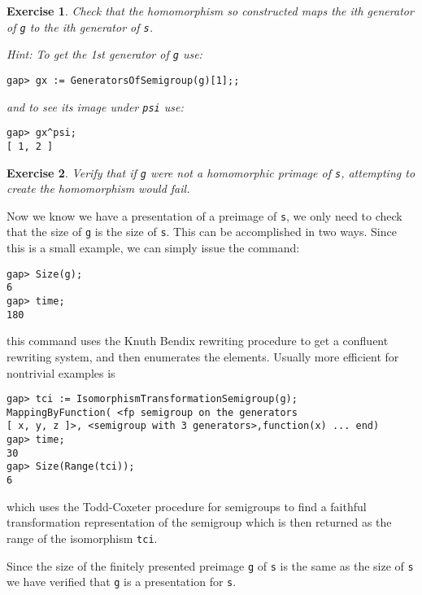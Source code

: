 \documentclass{ws-p8-50x6-00}
\theoremstyle{plain} \newtheorem{Thm}{Theorem}
\theoremstyle{plain} \newtheorem{Cor}{Corollary}
\theoremstyle{plain} \newtheorem{Lemma}{Lemma}
\theoremstyle{plain} \newtheorem{Prop}{Proposition}
\theoremstyle{plain} \newtheorem{Ex}{Exercise}
\begin{document}
\begin{Ex}
Check that the homomorphism so constructed maps the ith generator
of {\tt g} to the ith generator of {\tt s}.
{\rm Hint: To get the 1st generator of {\tt g} use:
\begin{verbatim}
gap> gx := GeneratorsOfSemigroup(g)[1];;
\end{verbatim}
and to see its image under {\tt psi} use:
\begin{verbatim}
gap> gx^psi;                                      
[ 1, 2 ]
\end{verbatim}}
\end{Ex}

\begin{Ex} 
Verify that if {\tt g} were not a homomorphic primage of {\tt s},
attempting to create  the  homomorphism would fail.
\end{Ex}

Now we know we have a presentation of a preimage of {\tt s}, we only 
need to check that the size of {\tt g} is the size of {\tt s}.
This can be accomplished in two ways. Since this is a small example,
we can simply issue the command:
\begin{verbatim}
gap> Size(g);                                                                  
6
gap> time;
180
\end{verbatim}
this command uses the Knuth Bendix rewriting procedure\cite{sims}  to 
get a confluent rewriting system, and then enumerates the elements.
Usually more efficient for nontrivial examples is 
\begin{verbatim}
gap> tci := IsomorphismTransformationSemigroup(g);
MappingByFunction( <fp semigroup on the generators 
[ x, y, z ]>, <semigroup with 3 generators>,function(x) ... end)
gap> time;
30
gap> Size(Range(tci));
6
\end{verbatim}
which uses the Todd-Coxeter procedure
for semigroups\cite{neumann} to find a 
faithful transformation representation of the semigroup which is then
returned as the range of the isomorphism {\tt tci}.

Since the size of the finitely presented preimage {\tt g} of {\tt s} is the
same as the size of {\tt s} we have verified that {\tt g} is a 
presentation for {\tt s}.
\end{document}
